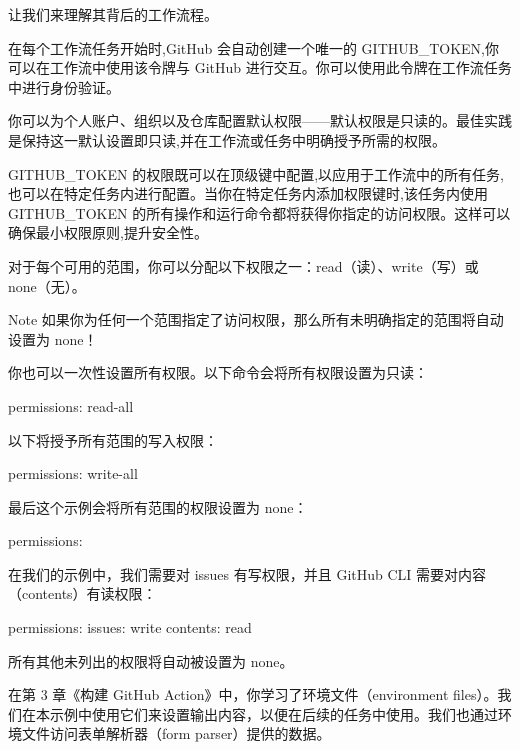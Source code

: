 让我们来理解其背后的工作流程。


在每个工作流任务开始时,GitHub 会自动创建一个唯一的 GITHUB\_TOKEN,你可以在工作流中使用该令牌与 GitHub 进行交互。你可以使用此令牌在工作流任务中进行身份验证。

你可以为个人账户、组织以及仓库配置默认权限——默认权限是只读的。最佳实践是保持这一默认设置即只读,并在工作流或任务中明确授予所需的权限。

GITHUB\_TOKEN 的权限既可以在顶级键中配置,以应用于工作流中的所有任务,也可以在特定任务内进行配置。当你在特定任务内添加权限键时,该任务内使用 GITHUB\_TOKEN 的所有操作和运行命令都将获得你指定的访问权限。这样可以确保最小权限原则,提升安全性。

对于每个可用的范围，你可以分配以下权限之一：read（读）、write（写）或 none（无）。

\begin{myNotic}{Note}
如果你为任何一个范围指定了访问权限，那么所有未明确指定的范围将自动设置为 none！
\end{myNotic}

你也可以一次性设置所有权限。以下命令会将所有权限设置为只读：

\begin{shell}
permissions: read-all
\end{shell}

以下将授予所有范围的写入权限：

\begin{shell}
permissions: write-all
\end{shell}

最后这个示例会将所有范围的权限设置为 none：

\begin{shell}
permissions: {}
\end{shell}

在我们的示例中，我们需要对 issues 有写权限，并且 GitHub CLI 需要对内容（contents）有读权限：

\begin{shell}
permissions:
  issues: write
  contents: read
\end{shell}

所有其他未列出的权限将自动被设置为 none。


在第 3 章《构建 GitHub Action》中，你学习了环境文件（environment files）。我们在本示例中使用它们来设置输出内容，以便在后续的任务中使用。我们也通过环境文件访问表单解析器（form parser）提供的数据。

